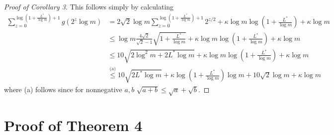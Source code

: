 \documentclass[twoside]{article}
\begin{document}
\begin{proof}[Proof of Corollary 3]
 This follows simply by calculating 
    \begin{align}
        \sum_{z=0}^{\log\left(1+\frac{L^*}{\log m}\right)+1} g(2^z \log m) &= 2\sqrt{2}\log m \sum_{z=0}^{\log\left(1+\frac{L^*}{\log m}\right)+1} 2^{z/2} + \kappa \log m \log\left(1+\frac{L^*}{\log m}\right) + \kappa \log m\nonumber\\
        &\le  \log m \frac{4\sqrt{2}}{\sqrt{2}-1}\sqrt{1+\frac{L^*}{\log m}} + \kappa \log m \log\left(1+\frac{L^*}{\log m}\right)+ \kappa \log m \nonumber \\
        &\le 10 \sqrt{2\log^2 m + 2L^* \log m} + \kappa \log m \log\left(1+\frac{L^*}{\log m}\right) + \kappa \log m \nonumber\\
        &\stackrel{\text{(a)}}{\le} 10 \sqrt{2L^* \log m} + \kappa\log\left(1+\frac{L^*}{\log m}\right)\log m + 10\sqrt{2} \log m + \kappa \log m \nonumber
    \end{align}
    where (a) follows since for nonnegative $a,b$ $\sqrt{a+b} \le \sqrt{a}+ \sqrt{b}$.
\end{proof}

\section{Proof of Theorem 4}
\end{document}
